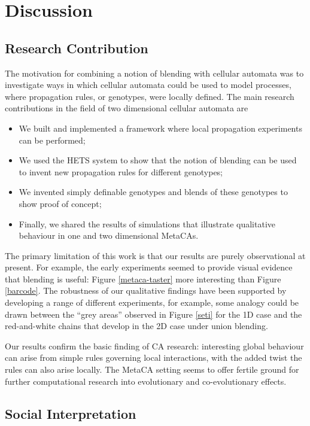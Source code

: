 \documentclass{AISB2008}
\begin{document}
\FloatBarrier

\section{Discussion}

\subsection{Research Contribution}

The motivation for combining a notion of blending with cellular
automata was to investigate ways in which cellular automata could be
used to model processes, where propagation rules, or genotypes, were
locally defined.  The main research contributions in the field of two
dimensional cellular automata are
\begin{itemize}
\item We built and implemented a framework where local propagation
  experiments can be performed;
\item We used the HETS system to show that the notion of blending can
  be used to invent new propagation rules for different genotypes;
\item We invented simply definable genotypes and blends of these
  genotypes to show proof of concept;
\item Finally, we shared the results of simulations that illustrate
  qualitative behaviour in one and two dimensional MetaCAs.
\end{itemize}

The primary limitation of this work is that our results are purely
observational at present.  For example, the early experiments seemed
to provide visual evidence that blending is useful: Figure
\ref{metaca-taster} more interesting than Figure \ref{barcode}.  The
robustness of our qualitative findings have been supported by
developing a range of different experiments, for example, some analogy
could be drawn between the ``grey areas'' observed in Figure
\ref{seti} for the 1D case and the red-and-white chains that develop
in the 2D case under union blending.

Our results confirm the basic finding of CA research: interesting
global behaviour can arise from simple rules governing local
interactions, with the added twist the rules can also arise locally.
The MetaCA setting seems to offer fertile ground for further
computational research into evolutionary and co-evolutionary effects.

\subsection{Social Interpretation}
\end{document}
